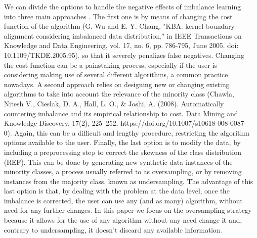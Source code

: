 \documentclass[parskip=full]{scrartcl}
\begin{document}
We can divide the options to handle the negative effects of imbalance learning into three main approaches \cite{Fernandez2013}. The first one is by means of changing the cost function of the algorithm (G. Wu and E. Y. Chang, "KBA: kernel boundary alignment considering imbalanced data distribution," in IEEE Transactions on Knowledge and Data Engineering, vol. 17, no. 6, pp. 786-795, June 2005. doi: 10.1109/TKDE.2005.95), so that it severely penalizes false negatives. Changing the cost function can be a painstaking process, especially if the user is considering making use of several different algorithms, a common practice nowadays. A second approach relies on designing new or changing existing algorithms to take into account the relevance of the minority class (Chawla, Nitesh V., Cieslak, D. A., Hall, L. O., & Joshi, A. (2008). Automatically countering imbalance and its empirical relationship to cost. Data Mining and Knowledge Discovery, 17(2), 225–252. https://doi.org/10.1007/s10618-008-0087-0). Again, this can be a difficult and lengthy procedure, restricting the algorithm options available to the user. Finally, the last option is to modify the data, by including a preprocessing step to correct the skewness of the class distribution (REF). This can be done by generating new synthetic data instances of the minority classes, a process usually referred to as oversampling, or by removing instances from the majority class, known as undersampling. The advantage of this last option is that, by dealing with the problem at the data level, once the imbalance is corrected, the user can use any (and as many) algorithm, without need for any further changes. In this paper we focus on the oversampling strategy because it allows for the use of any algorithm without any need change it and, contrary to undersampling, it doesn’t discard any available information.
\end{document}
